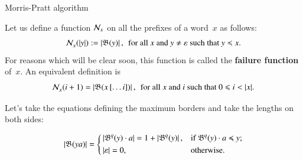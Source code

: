 %
\begin{frame}{Morris-Pratt algorithm}

Let us define a function \(\mathcal{N}_{x}\) on all the prefixes of
a word~\(x\) as follows:
\begin{equation*}
  \mathcal{N}_{x}^{}(\left\lvert\smash{y}\right\rvert)
:= \left\lvert\smash{\mathfrak{B}^{}(y)}\right\rvert,\,\; \text{for
    all \(x\) and \(y \neq \varepsilon\) such
    that \(y \mathrel{\preccurlyeq}x\)}.
\end{equation*}
For reasons which will be clear soon, this function is called the
\textbf{failure function} of~\(x\). An equivalent definition is
\begin{equation*}
  \MPfailure{x}{}{i+1}
= \len{\Border{}{\ind{x}{\dots i}}}, \,\;
\text{for all \(x\) and  \(i\) such that
\(0 \leqslant i < \len{x}\)}.
\end{equation*}

Let's take the equations defining the maximum borders and take the
lengths on both sides:

\begin{equation*}
\left\lvert\smash{\mathfrak{B}^{}(ya)}\right\rvert =
\left\{
  \begin{aligned}
   & \left\lvert\smash{\mathfrak{B}^{q}(y) \cdot a}\right\rvert = 1 + \left\lvert\smash{\mathfrak{B}^{q}(y)}\right\rvert,
   && \text{if \(\mathfrak{B}^{q}(y) \cdot a \mathrel{\preccurlyeq}y\)};\\
   & \left\lvert\smash{\varepsilon}\right\rvert = 0,
   && \text{otherwise.}
  \end{aligned}
\right.
\end{equation*}

\end{frame}

